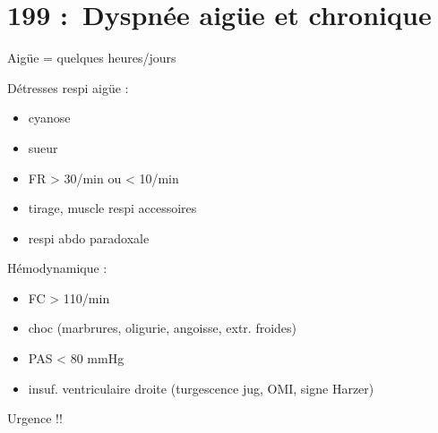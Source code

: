 \documentclass{article}
\begin{document}

\section{199 : Dyspnée aigüe et chronique}%
\label{sec:199_dyspnee_aigue_et_chronique}

Aigüe = quelques heures/jours

Détresses respi aigüe :
\begin{itemize}
  \item cyanose
  \item sueur
  \item FR > 30/min ou < 10/min
  \item tirage, muscle respi accessoires
  \item respi abdo paradoxale
\end{itemize}
Hémodynamique :
\begin{itemize}
  \item FC > 110/min
  \item choc (marbrures, oligurie, angoisse, extr. froides)
  \item PAS < 80 mmHg
  \item insuf. ventriculaire droite (turgescence jug, OMI, signe Harzer)
\end{itemize}
Urgence !!
\end{document}
